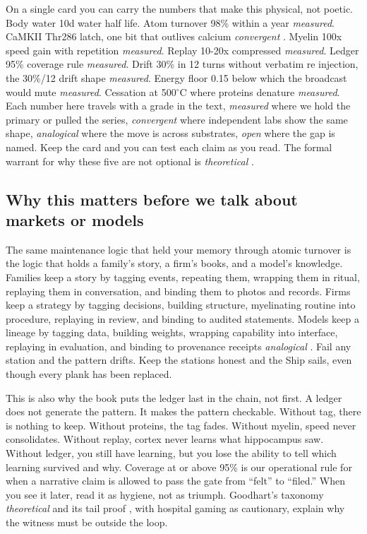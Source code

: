 On a single card you can carry the numbers that make this physical, not poetic. Body water 10d water half life. Atom turnover 98\% within a year \textit{measured}. CaMKII Thr286 latch, one bit that outlives calcium \textit{convergent} \citep{kandel2000}. Myelin 100x speed gain with repetition \textit{measured}. Replay 10-20x compressed \textit{measured}. Ledger 95\% coverage rule \textit{measured}. Drift 30\% in 12 turns without verbatim re injection, the 30\%/12 drift shape \textit{measured}. Energy floor 0.15 below which the broadcast would mute \textit{measured}. Cessation at 500$^\circ$C where proteins denature \textit{measured}. Each number here travels with a grade in the text, \textit{measured} where we hold the primary or pulled the series, \textit{convergent} where independent labs show the same shape, \textit{analogical} where the move is across substrates, \textit{open} where the gap is named. Keep the card and you can test each claim as you read. The formal warrant for why these five are not optional is \textit{theoretical} \citep{nayebi2026}.

\subsection*{Why this matters before we talk about markets or models}

The same maintenance logic that held your memory through atomic turnover is the logic that holds a family's story, a firm's books, and a model's knowledge. Families keep a story by tagging events, repeating them, wrapping them in ritual, replaying them in conversation, and binding them to photos and records. Firms keep a strategy by tagging decisions, building structure, myelinating routine into procedure, replaying in review, and binding to audited statements. Models keep a lineage by tagging data, building weights, wrapping capability into interface, replaying in evaluation, and binding to provenance receipts \textit{analogical} \citep{shumailov2024,panickssery2024}. Fail any station and the pattern drifts. Keep the stations honest and the Ship sails, even though every plank has been replaced.

This is also why the book puts the ledger last in the chain, not first. A ledger does not generate the pattern. It makes the pattern checkable. Without tag, there is nothing to keep. Without proteins, the tag fades. Without myelin, speed never consolidates. Without replay, cortex never learns what hippocampus saw. Without ledger, you still have learning, but you lose the ability to tell which learning survived and why. Coverage at or above 95\% is our operational rule for when a narrative claim is allowed to pass the gate from ``felt'' to ``filed.'' When you see it later, read it as hygiene, not as triumph. Goodhart's taxonomy \textit{theoretical} \citep{goodhart2505} and its tail proof \citep{goodhart2410}, with hospital gaming \citep{bevan2006} as cautionary, explain why the witness must be outside the loop.

